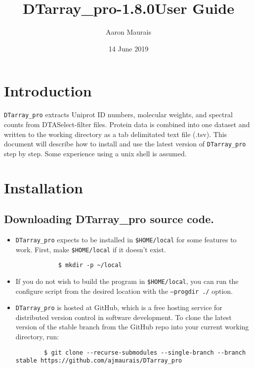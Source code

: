 \documentclass[12pt]{article}
\newcommand{\VERSION}{1.8.0}
\begin{document}
	
	\title{DTarray\_pro-\VERSION \space User Guide}
	\author{Aaron Maurais}
	\date{14 June 2019}
	
	\maketitle
	\tableofcontents
	\newpage
		
	\section{Introduction}
	
	\texttt{DTarray\_pro} extracts Uniprot ID numbers, molecular weights, and spectral counts from DTASelect-filter files. Protein data is combined into one dataset and written to the working directory as a tab delimitated text file (.tsv). This document will describe how to install and use the latest version of \texttt{DTarray\_pro} step by step. Some experience using a unix shell is assumed.  
	
	
	\section{Installation}
	
	\subsection{Downloading DTarray\_pro source code.}

	\begin{itemize}

	\item \texttt{DTarray\_pro} expects to be installed in \texttt{\$HOME/local} for some features to work. First, make \texttt{\$HOME/local} if it doesn't exist.

	\begin{lstlisting}
	 		$ mkdir -p ~/local
	\end{lstlisting}

	\item If you do not wish to build the program in \texttt{\$HOME/local}, you can run the configure script from the desired location with the \texttt{--progdir ./} option.

	\item \texttt{DTarray\_pro} is hosted at GitHub, which is a free hosting service for distributed version control in software development. To clone the latest version of the stable branch from the GitHub repo into your current working directory, run:

	\begin{lstlisting}
		$ git clone --recurse-submodules --single-branch --branch stable https://github.com/ajmaurais/DTarray_pro
	\end{lstlisting}

	\end{itemize}
\end{document}
